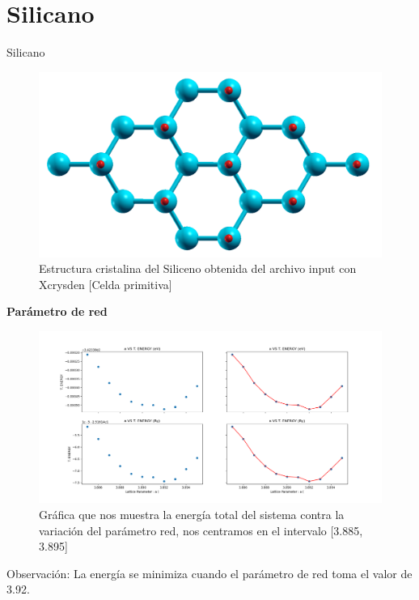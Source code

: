 \section{Silicano}

\begin{frame}{Silicano}
    \begin{figure}[H]
        \centering
        \includegraphics[scale=0.2]{images_silicano/silicano_structure.png}
        \caption{Estructura cristalina del Siliceno obtenida del archivo input con Xcrysden [Celda primitiva]}
    \end{figure}
\end{frame}

\begin{frame}
    \textbf{Parámetro de red}
    \begin{figure}[H]
        \centering
        \includegraphics[scale=0.2]{images_silicano/Lattice_parameter_vs_Energy_third.png}
        \caption{Gráfica que nos muestra la energía total del sistema contra la variación del parámetro red, nos centramos en el intervalo [3.885, 3.895]}
    \end{figure}
    \noindent
    Observación: La energía se minimiza cuando el parámetro de red toma el valor de 3.92.
\end{frame}

